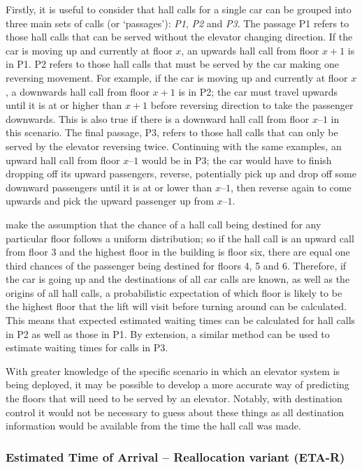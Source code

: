 \documentclass{UoYCSproject}
\begin{document}
Firstly, it is useful to consider that hall calls for a single car can be grouped into three main sets of calls (or `passages'): \textit{P1}, \textit{P2} and \textit{P3}.  The passage P1 refers to those hall calls that can be served without the elevator changing direction.  If the car is moving up and currently at floor $x$, an upwards hall call from floor $x + 1$ is in P1.  P2 refers to those hall calls that must be served by the car making one reversing movement.  For example, if the car is moving up and currently at floor $x$, a downwards hall call from floor $x + 1$ is in P2; the car must travel upwards until it is at or higher than $x + 1$ before reversing direction to take the passenger downwards.  This is also true if there is a downward hall call from floor $x – 1$ in this scenario.  The final passage, P3, refers to those hall calls that can only be served by the elevator reversing twice.  Continuing with the same examples, an upward hall call from floor $x – 1$ would be in P3; the car would have to finish dropping off its upward passengers, reverse, potentially pick up and drop off some downward passengers until it is at or lower than $x – 1$, then reverse again to come upwards and pick the upward passenger up from $x – 1$.

\citet{Rong2003} make the assumption that the chance of a hall call being destined for any particular floor follows a uniform distribution; so if the hall call is an upward call from floor 3 and the highest floor in the building is floor six, there are equal one third chances of the passenger being destined for floors 4, 5 and 6.  Therefore, if the car is going up and the destinations of all car calls are known, as well as the origins of all hall calls, a probabilistic expectation of which floor is likely to be the highest floor that the lift will visit before turning around can be calculated.  This means that expected estimated waiting times can be calculated for hall calls in P2 as well as those in P1.  By extension, a similar method can be used to estimate waiting times for calls in P3.

With greater knowledge of the specific scenario in which an elevator system is being deployed, it may be possible to develop a more accurate way of predicting the floors that will need to be served by an elevator.  Notably, with destination control it would not be necessary to guess about these things as all destination information would be available from the time the hall call was made.

\subsubsection{Estimated Time of Arrival -- Reallocation variant (ETA-R) \citep{Rong2003}}
\end{document}
